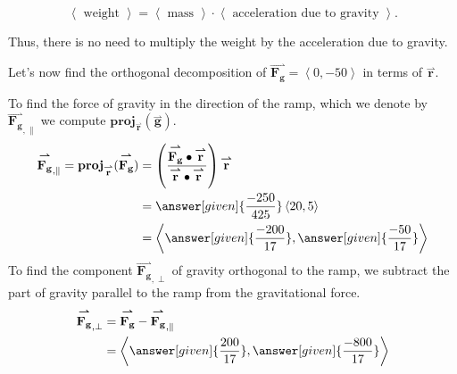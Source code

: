 \documentclass{ximera}
\begin{document}
\begin{example}
\begin{remark}
\[
\left<\textrm{ weight }\right> = \left< \textrm{ mass }\right> \cdot \left<\textrm{ acceleration due to gravity } \right>.
\]

Thus, there is no need to multiply the weight by the acceleration due to gravity.
\end{remark} 







Let's now find the orthogonal decomposition of $\overset{\boldsymbol{\rightharpoonup}}{\mathbf{F_g}} =
  \left< 0,-50 \right>$ in terms of $\overset{\boldsymbol{\rightharpoonup}}{\mathbf{r}}$. 
  
    \begin{explanation}
    To find the force of gravity in the direction of the ramp, which we denote by $\overset{\boldsymbol{\rightharpoonup}}{\mathbf{F_g}}_{, \parallel}$ we
    compute $\mathbf{proj}_{\overset{\boldsymbol{\rightharpoonup}}{\mathbf{r}}}(\overset{\boldsymbol{\rightharpoonup}}{\mathbf{g}})$.
    \begin{align*}
     \overset{\boldsymbol{\rightharpoonup}}{\mathbf{F_g}}_{, \parallel} = \mathbf{proj}_{\overset{\boldsymbol{\rightharpoonup}}{\mathbf{r}}}(\overset{\boldsymbol{\rightharpoonup}}{\mathbf{F_g}}) &= \left(\frac{\overset{\boldsymbol{\rightharpoonup}}{\mathbf{F_g}} \bullet \overset{\boldsymbol{\rightharpoonup}}{\mathbf{r}}}{\overset{\boldsymbol{\rightharpoonup}}{\mathbf{r}} \bullet \overset{\boldsymbol{\rightharpoonup}}{\mathbf{r}}}\right)\overset{\boldsymbol{\rightharpoonup}}{\mathbf{r}}\\
      &=  \answer[given]{\frac{-250}{425}} \left< 20,5 \right>\\
      &= \left< \answer[given]{\frac{-200}{17}},\answer[given]{\frac{-50}{17}} \right>
    \end{align*}
    To find the component $\overset{\boldsymbol{\rightharpoonup}}{\mathbf{F_g}}_{, \perp}$ of gravity orthogonal to the ramp, we subtract the part of gravity parallel to the ramp from the gravitational force.
    \begin{align*}
      \overset{\boldsymbol{\rightharpoonup}}{\mathbf{F_g}}_{, \perp} &= \overset{\boldsymbol{\rightharpoonup}}{\mathbf{F_g}} - \overset{\boldsymbol{\rightharpoonup}}{\mathbf{F_g}}_{, \parallel} \\
      &= \left< \answer[given]{\frac{200}{17}},\answer[given]{\frac{-800}{17}} \right>
    \end{align*}
    \begin{image}

\end{image}
\end{explanation}
\end{example}
\end{document}
